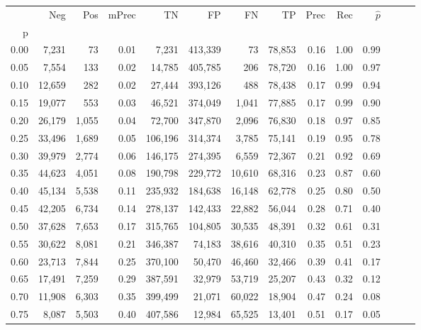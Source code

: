 \begin{tabular}{rrrrrrrrrrrrrr}
\toprule
{} &     Neg &    Pos & mPrec &       TN &       FP &      FN &      TP &  Prec &   Rec & $\hat{p}$ \\
p    &         &        &       &          &          &         &         &       &       &           \\
\midrule
0.00 &   7,231 &     73 &  0.01 &    7,231 &  413,339 &      73 &  78,853 &  0.16 &  1.00 &      0.99 \\
0.05 &   7,554 &    133 &  0.02 &   14,785 &  405,785 &     206 &  78,720 &  0.16 &  1.00 &      0.97 \\
0.10 &  12,659 &    282 &  0.02 &   27,444 &  393,126 &     488 &  78,438 &  0.17 &  0.99 &      0.94 \\
0.15 &  19,077 &    553 &  0.03 &   46,521 &  374,049 &   1,041 &  77,885 &  0.17 &  0.99 &      0.90 \\
0.20 &  26,179 &  1,055 &  0.04 &   72,700 &  347,870 &   2,096 &  76,830 &  0.18 &  0.97 &      0.85 \\
0.25 &  33,496 &  1,689 &  0.05 &  106,196 &  314,374 &   3,785 &  75,141 &  0.19 &  0.95 &      0.78 \\
0.30 &  39,979 &  2,774 &  0.06 &  146,175 &  274,395 &   6,559 &  72,367 &  0.21 &  0.92 &      0.69 \\
0.35 &  44,623 &  4,051 &  0.08 &  190,798 &  229,772 &  10,610 &  68,316 &  0.23 &  0.87 &      0.60 \\
0.40 &  45,134 &  5,538 &  0.11 &  235,932 &  184,638 &  16,148 &  62,778 &  0.25 &  0.80 &      0.50 \\
0.45 &  42,205 &  6,734 &  0.14 &  278,137 &  142,433 &  22,882 &  56,044 &  0.28 &  0.71 &      0.40 \\
0.50 &  37,628 &  7,653 &  0.17 &  315,765 &  104,805 &  30,535 &  48,391 &  0.32 &  0.61 &      0.31 \\
0.55 &  30,622 &  8,081 &  0.21 &  346,387 &   74,183 &  38,616 &  40,310 &  0.35 &  0.51 &      0.23 \\
0.60 &  23,713 &  7,844 &  0.25 &  370,100 &   50,470 &  46,460 &  32,466 &  0.39 &  0.41 &      0.17 \\
0.65 &  17,491 &  7,259 &  0.29 &  387,591 &   32,979 &  53,719 &  25,207 &  0.43 &  0.32 &      0.12 \\
0.70 &  11,908 &  6,303 &  0.35 &  399,499 &   21,071 &  60,022 &  18,904 &  0.47 &  0.24 &      0.08 \\
0.75 &   8,087 &  5,503 &  0.40 &  407,586 &   12,984 &  65,525 &  13,401 &  0.51 &  0.17 &      0.05 \\

\end{tabular}
